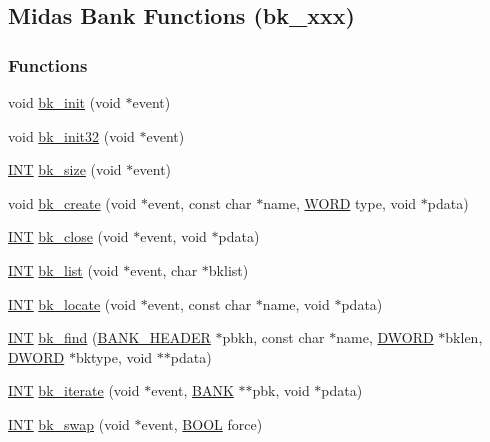 \subsection{Midas Bank Functions (bk\_\-xxx)}
\label{group__bkfunctionc}
\subsubsection*{Functions}
\begin{DoxyCompactItemize}
\item 
void \hyperlink{group__bkfunctionc_gac6fadde40824dbf7bd70abedd29be2bd}{bk\_\-init} (void $\ast$event)
\item 
void \hyperlink{group__bkfunctionc_gae7cbf587db63fcdf66dd18b29f08b6d2}{bk\_\-init32} (void $\ast$event)
\item 
\hyperlink{vppg_8h_a392e62da233ed3e2f7c3fd4f487a3896}{INT} \hyperlink{group__bkfunctionc_ga8fc93de36e62c4328cb6581be7f42a0f}{bk\_\-size} (void $\ast$event)
\item 
void \hyperlink{group__bkfunctionc_ga4bb781187e18834136ed8ac368d53413}{bk\_\-create} (void $\ast$event, const char $\ast$name, \hyperlink{vt2_8h_a2b0e863dadf920709ec53d9088ee7c91}{WORD} type, void $\ast$pdata)
\item 
\hyperlink{vppg_8h_a392e62da233ed3e2f7c3fd4f487a3896}{INT} \hyperlink{group__bkfunctionc_ga132dc71c8f74b478cdcc59bc1d9f6a26}{bk\_\-close} (void $\ast$event, void $\ast$pdata)
\item 
\hyperlink{vppg_8h_a392e62da233ed3e2f7c3fd4f487a3896}{INT} \hyperlink{group__bkfunctionc_ga4d8a0ef23239ae478544fa96a0e98a33}{bk\_\-list} (void $\ast$event, char $\ast$bklist)
\item 
\hyperlink{vppg_8h_a392e62da233ed3e2f7c3fd4f487a3896}{INT} \hyperlink{group__bkfunctionc_gafe085ddb11bdcff4ca461224254289ef}{bk\_\-locate} (void $\ast$event, const char $\ast$name, void $\ast$pdata)
\item 
\hyperlink{vppg_8h_a392e62da233ed3e2f7c3fd4f487a3896}{INT} \hyperlink{group__bkfunctionc_ga5ecb1d77784b02c3f79684ab816d0ea7}{bk\_\-find} (\hyperlink{structBANK__HEADER}{BANK\_\-HEADER} $\ast$pbkh, const char $\ast$name, \hyperlink{vt2_8h_a798af1e30bc65f319c1a246cecf59e39}{DWORD} $\ast$bklen, \hyperlink{vt2_8h_a798af1e30bc65f319c1a246cecf59e39}{DWORD} $\ast$bktype, void $\ast$$\ast$pdata)
\item 
\hyperlink{vppg_8h_a392e62da233ed3e2f7c3fd4f487a3896}{INT} \hyperlink{group__bkfunctionc_gab6012589013da85b128d8443501a4a44}{bk\_\-iterate} (void $\ast$event, \hyperlink{structBANK}{BANK} $\ast$$\ast$pbk, void $\ast$pdata)
\item 
\hyperlink{vppg_8h_a392e62da233ed3e2f7c3fd4f487a3896}{INT} \hyperlink{group__bkfunctionc_ga44b7381af9b91fbdf2f6d59f55451ea1}{bk\_\-swap} (void $\ast$event, \hyperlink{vt2_8h_a239c7f0d40651c3e419c5b9651507d14}{BOOL} force)
\end{DoxyCompactItemize}


